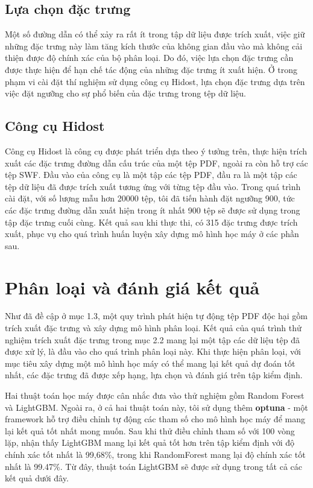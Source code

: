 \documentclass[./../main.tex]{subfiles}
\begin{document}
\subsection*{Lựa chọn đặc trưng}
Một số đường dẫn có thể xảy ra rất ít trong tập dữ liệu được trích xuất, việc giữ những đặc trưng này làm tăng kích thước của không gian đầu vào mà không cải thiện được độ chính xác của bộ phân loại. Do đó, việc lựa chọn đặc trưng cần được thực hiện để hạn chế tác động của những đặc trưng ít xuất hiện. Ở trong phạm vi cài đặt thí nghiệm sử dụng công cụ Hidost, lựa chọn đặc trưng dựa trên việc đặt ngưỡng cho sự phổ biến của đặc trưng trong tệp dữ liệu.
\subsection*{Công cụ Hidost}
Công cụ Hidost  là công cụ được phát triển dựa theo ý tưởng trên, thực hiện trích xuất các đặc trưng đường dẫn cấu trúc của một tệp PDF, ngoài ra còn hỗ trợ các tệp SWF. Đầu vào của công cụ là một tập các tệp PDF, đầu ra là một tập các tệp dữ liệu đã được trích xuất tương ứng với từng tệp đầu vào. Trong quá trình cài đặt, với số lượng mẫu hơn 20000 tệp, tôi đã tiến hành đặt ngưỡng 900, tức các đặc trưng đường dẫn xuất hiện trong ít nhất 900 tệp sẽ được sử dụng trong tập đặc trưng cuối cùng. Kết quả sau khi thực thi, có 315 đặc trưng được trích xuất, phục vụ cho quá trình huấn luyện xây dựng mô hình học máy ở các phần sau.

\section{Phân loại và đánh giá kết quả}

Như đã đề cập ở mục 1.3, một quy trình phát hiện tự động tệp PDF độc hại gồm trích xuất đặc trưng và xây dựng mô hình phân loại. Kết quả của quá trình thử nghiệm trích xuất đặc trưng trong mục 2.2 mang lại một tập các dữ liệu tệp đã được xử lý, là đầu vào cho quá trình phân loại này. Khi thực hiện phân loại, với mục tiêu xây dựng một mô hình học máy có thể mang lại kết quả dự đoán tốt nhất, các đặc trưng đã được xếp hạng, lựa chọn và đánh giá trên tập kiểm định.

Hai thuật toán học máy được cân nhắc đưa vào thử nghiệm gồm Random Forest và LightGBM. Ngoài ra, ở cả hai thuật toán này, tôi sử dụng thêm \textbf{optuna} - một framework hỗ trợ điều chỉnh tự động các tham số cho mô hình học máy để mang lại kết quả tốt nhất mong muốn. Sau khi thử điều chỉnh tham số với 100 vòng lặp, nhận thấy LightGBM mang lại kết quả tốt hơn trên tập kiểm định với độ chính xác tốt nhất là 99,68\%, trong khi RandomForest mang lại độ chính xác tốt nhất là 99.47\%. Từ đây, thuật toán LightGBM sẽ được sử dụng trong tất cả các kết quả dưới đây.
\end{document}
